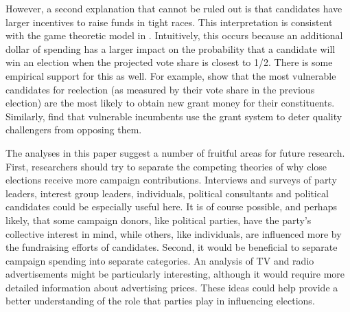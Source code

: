 \documentclass[12pt,final,fleqn]{article}
\theoremstyle{plain}
\begin{document}
However, a second explanation that cannot be ruled out is that candidates have larger incentives to raise funds in tight races. This interpretation is consistent with the game theoretic model in \citet{erikson2000equilibria}. Intuitively, this occurs because an additional dollar of spending has a larger impact on the probability that a candidate will win an election when the projected vote share is closest to 1/2. There is some empirical support for this as well. For example, \citet{stein1994congressional} show that the most vulnerable candidates for reelection (as measured by their vote share in the previous election) are the most likely to obtain new grant money for their constituents. Similarly, \citet{bickers1996electoral} find that vulnerable incumbents use the grant system to deter quality challengers from opposing them.

The analyses in this paper suggest a number of fruitful areas for future research. First, researchers should try to separate the competing theories of why close elections receive more campaign contributions. Interviews and surveys of party leaders, interest group leaders, individuals, political consultants and political candidates could be especially useful here. It is of course possible, and perhaps likely, that some campaign donors, like political parties, have the party's collective interest in mind, while others, like individuals, are influenced more by the fundraising efforts of candidates.  Second, it would be beneficial to separate campaign spending into separate categories. An analysis of TV and radio advertisements might be particularly interesting, although it would require more detailed information about advertising prices. These ideas could help provide a better understanding of the role that parties play in influencing elections.
\end{document}
